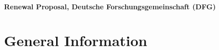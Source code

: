 \documentclass[11pt,a4paper]{article}
\theoremstyle{plain} \newtheorem{define}{Definition}[section]
\begin{document}
%
%


\begin{center}
\bf Renewal Proposal, Deutsche Forschungsgemeinschaft (DFG)
\end{center}











\vspace{-0.0cm}


\section*{General Information}
\end{document}
